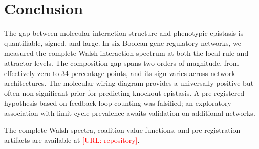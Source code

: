 \documentclass[11pt]{article}
\begin{document}
\section{Conclusion}
\label{sec:conclusion}

The gap between molecular interaction structure and phenotypic
epistasis is quantifiable, signed, and large. In six Boolean gene
regulatory networks, we measured the complete Walsh interaction
spectrum at both the local rule and attractor levels. The composition
gap spans two orders of magnitude, from effectively zero to 34
percentage points, and its sign varies across network architectures.
The molecular wiring diagram provides a universally positive but
often non-significant prior for predicting knockout epistasis. A
pre-registered hypothesis based on feedback loop counting was
falsified; an exploratory association with limit-cycle prevalence
awaits validation on additional networks.

The complete Walsh spectra, coalition value functions, and
pre-registration artifacts are available at
\textcolor{red}{[URL: repository]}.




% 
\end{document}
